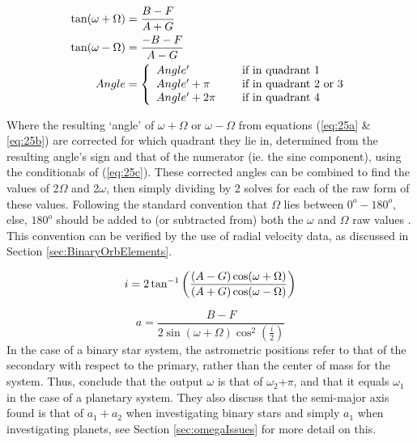 \documentclass[10pt,preprint]{aastex}
\begin{document}
\begin{subequations}
\begin{align}\label{eq:25a}
\tan(\omega+\Omega)& = \frac{B-F}{A+G} \\
\label{eq:25b}
\tan(\omega-\Omega)& = \frac{-B-F}{A-G}\\
\label{eq:25c}
Angle& = \left\{ \begin{array}{l l l} Angle^{\prime}& \quad \text{ if in quadrant 1}\\ Angle^{\prime} + \pi& \quad \text{ if in quadrant 2 or 3}\\ Angle^{\prime} + 2\pi& \quad \text{ if in quadrant 4}  \end{array} \right.
\end{align}
\end{subequations}

Where the resulting `angle' of $\omega+\Omega$ or $ \omega-\Omega$ from equations (\ref{eq:25a} \& \ref{eq:25b}) are corrected for which quadrant they lie in, determined from the resulting angle's sign and that of the numerator (ie. the sine component), using the conditionals of (\ref{eq:25c}).  These corrected angles can be combined to find the values of 2$\Omega$ and 2$\omega$, then simply dividing by 2 solves for each of the raw form of these values.  Following the standard convention that $\Omega$ lies between $0^{o}-180^{o}$, else, $180^{o}$ should be added to (or subtracted from) both the $\omega$ and $\Omega$ raw values \citep{aitken}.  This convention can be verified by the use of radial velocity data, as discussed in Section \ref{sec:BinaryOrbElements}.

\begin{equation}\label{eq:26}
i = 2\tan^{-1}\bigg(\frac{(A-G)\cos(\omega+\Omega)}{(A+G)\cos(\omega-\Omega)}  \bigg)\\
\end{equation}

\begin{equation}\label{eq:27}
a = \frac{B-F}{2\sin(\omega+\Omega)\cos^2(\frac{i}{2})}
\end{equation}
In the case of a binary star system, the astrometric positions refer to that of the secondary with respect to the primary, rather than the center of mass for the system.  Thus, \citet{Shulze-Hartung} conclude that the output $\omega$ is that of $\omega_2$+$\pi$, and that it equals $\omega_1$ in the case of a planetary system.  They also discuss that the semi-major axis found is that of $a_1+a_2$ when investigating binary stars and simply $a_1$ when investigating planets, see Section \ref{sec:omegaIssues} for more detail on this.
\end{document}
